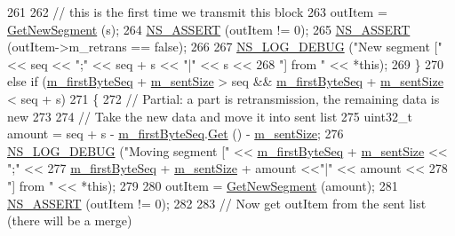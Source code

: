 \begin{DoxyCode}
261 
262       \textcolor{comment}{// this is the first time we transmit this block}
263       outItem = \hyperlink{classns3_1_1TcpTxBuffer_a7f8012f60263f1184f63d68f95d9fed6}{GetNewSegment} (s);
264       \hyperlink{assert_8h_a6dccdb0de9b252f60088ce281c49d052}{NS\_ASSERT} (outItem != 0);
265       \hyperlink{assert_8h_a6dccdb0de9b252f60088ce281c49d052}{NS\_ASSERT} (outItem->m\_retrans == \textcolor{keyword}{false});
266 
267       \hyperlink{group__logging_ga413f1886406d49f59a6a0a89b77b4d0a}{NS\_LOG\_DEBUG} (\textcolor{stringliteral}{"New segment ["} << seq << \textcolor{stringliteral}{";"} << seq + s << \textcolor{stringliteral}{"|"} << s <<
268                     \textcolor{stringliteral}{"] from "} << *\textcolor{keyword}{this});
269     \}
270   \textcolor{keywordflow}{else} \textcolor{keywordflow}{if} (\hyperlink{classns3_1_1TcpTxBuffer_a46b67e5cb3396b43a41dd3fd5b135346}{m\_firstByteSeq} + \hyperlink{classns3_1_1TcpTxBuffer_ae45302ec0a3b3d757b0f3ad85e88e363}{m\_sentSize} > seq && 
      \hyperlink{classns3_1_1TcpTxBuffer_a46b67e5cb3396b43a41dd3fd5b135346}{m\_firstByteSeq} + \hyperlink{classns3_1_1TcpTxBuffer_ae45302ec0a3b3d757b0f3ad85e88e363}{m\_sentSize} < seq + s)
271     \{
272       \textcolor{comment}{// Partial: a part is retransmission, the remaining data is new}
273 
274       \textcolor{comment}{// Take the new data and move it into sent list}
275       uint32\_t amount = seq + s - \hyperlink{classns3_1_1TcpTxBuffer_a46b67e5cb3396b43a41dd3fd5b135346}{m\_firstByteSeq}.\hyperlink{classns3_1_1TracedValue_a10fddd1de961ac65acfbeb440a1e8551}{Get} () - 
      \hyperlink{classns3_1_1TcpTxBuffer_ae45302ec0a3b3d757b0f3ad85e88e363}{m\_sentSize};
276       \hyperlink{group__logging_ga413f1886406d49f59a6a0a89b77b4d0a}{NS\_LOG\_DEBUG} (\textcolor{stringliteral}{"Moving segment ["} << \hyperlink{classns3_1_1TcpTxBuffer_a46b67e5cb3396b43a41dd3fd5b135346}{m\_firstByteSeq} + 
      \hyperlink{classns3_1_1TcpTxBuffer_ae45302ec0a3b3d757b0f3ad85e88e363}{m\_sentSize} << \textcolor{stringliteral}{";"} <<
277                     \hyperlink{classns3_1_1TcpTxBuffer_a46b67e5cb3396b43a41dd3fd5b135346}{m\_firstByteSeq} + \hyperlink{classns3_1_1TcpTxBuffer_ae45302ec0a3b3d757b0f3ad85e88e363}{m\_sentSize} + amount <<\textcolor{stringliteral}{"|"} << amount <<
278                     \textcolor{stringliteral}{"] from "} << *\textcolor{keyword}{this});
279 
280       outItem = \hyperlink{classns3_1_1TcpTxBuffer_a7f8012f60263f1184f63d68f95d9fed6}{GetNewSegment} (amount);
281       \hyperlink{assert_8h_a6dccdb0de9b252f60088ce281c49d052}{NS\_ASSERT} (outItem != 0);
282 
283       \textcolor{comment}{// Now get outItem from the sent list (there will be a merge)}

\end{DoxyCode}
